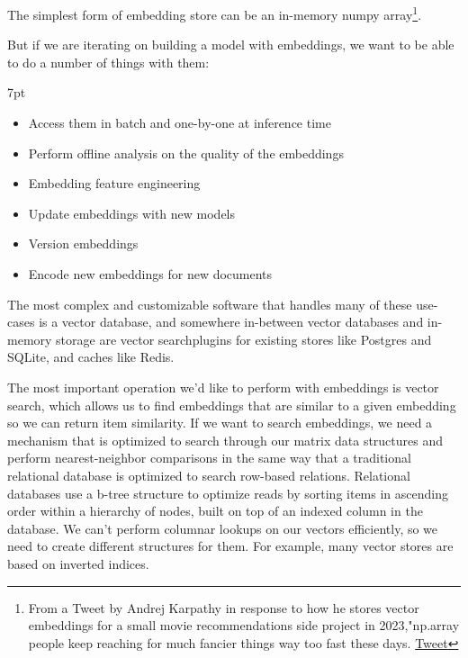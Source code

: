 \documentclass[11pt, table]{diazessay} %
\newenvironment{formal}{%
  \def\FrameCommand{%
	\hspace{1pt}%
	{\color{w_lightblue}\vrule width 2pt}%
	{\color{formalshade}\vrule width 4pt}%
	\colorbox{formalshade}%
  }%
  \MakeFramed{\advance\hsize-\width\FrameRestore}%
  \noindent\hspace{-4.55pt}%
  \begin{adjustwidth}{}{7pt}%
  \vspace{2pt}\vspace{2pt}%
}
{%
  \vspace{2pt}\end{adjustwidth}\endMakeFramed%
}
\begin{document}
\begin{sloppypar}
The simplest form of embedding store can be an in-memory numpy array\footnote{From a Tweet by Andrej Karpathy in response to how he stores vector embeddings for a small movie recommendations side project in 2023,"np.array people keep reaching for much fancier things way too fast these days. \href{https://twitter.com/karpathy/status/1647374645316968449}{Tweet}}.

 But if we are iterating on building a model with embeddings, we want to be able to do a number of things with them:

\begin{formal}
\begin{itemize}
  \item Access them in batch and one-by-one at inference time
  \item Perform offline analysis on the quality of the embeddings
  \item Embedding feature engineering
  \item Update embeddings with new models
  \item Version embeddings
   \item Encode new embeddings for new documents
\end{itemize}
\end{formal}

The most complex and customizable software that handles many of these use-cases is a vector database, and somewhere in-between vector databases and in-memory storage are vector searchplugins for existing stores like Postgres and SQLite, and caches like Redis.

The most important operation we'd like to perform with embeddings is vector search, which allows us to find embeddings that are similar to a given embedding so we can return item similarity. If we want to search embeddings, we need a mechanism that is optimized to search through our matrix data structures and perform nearest-neighbor comparisons in the same way that a traditional relational database is optimized to search row-based relations. Relational databases use a b-tree structure to optimize reads by sorting items in ascending order within a hierarchy of nodes, built on top of an indexed column in the database. We can't perform columnar lookups on our vectors efficiently, so we need to create different structures for them. For example, many vector stores are based on inverted indices.


\end{sloppypar}
\end{document}
